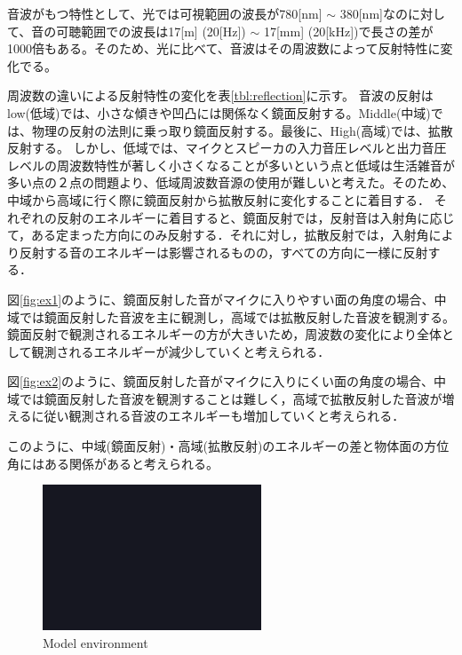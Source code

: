 音波がもつ特性として、光では可視範囲の波長が780[nm] $\sim$ 380[nm]なのに対して、音の可聴範囲での波長は17[m] (20[Hz]) $\sim$ 17[mm] (20[kHz])で長さの差が1000倍もある。そのため、光に比べて、音波はその周波数によって反射特性に変化でる。

周波数の違いによる反射特性の変化を表\ref{tbl:reflection}に示す。
音波の反射はlow(低域)では、小さな傾きや凹凸には関係なく鏡面反射する。Middle(中域)では、物理の反射の法則に乗っ取り鏡面反射する。最後に、High(高域)では、拡散反射する。
しかし、低域では、マイクとスピーカの入力音圧レベルと出力音圧レベルの周波数特性が著しく小さくなることが多いという点と低域は生活雑音が多い点の２点の問題より、低域周波数音源の使用が難しいと考えた。そのため、中域から高域に行く際に鏡面反射から拡散反射に変化することに着目する．
それぞれの反射のエネルギーに着目すると、鏡面反射では，反射音は入射角に応じて，ある定まった方向にのみ反射する．それに対し，拡散反射では，入射角により反射する音のエネルギーは影響されるものの，すべての方向に一様に反射する．

図\ref{fig:ex1}のように、鏡面反射した音がマイクに入りやすい面の角度の場合、中域では鏡面反射した音波を主に観測し，高域では拡散反射した音波を観測する。鏡面反射で観測されるエネルギーの方が大きいため，周波数の変化により全体として観測されるエネルギーが減少していくと考えられる．

図\ref{fig:ex2}のように、鏡面反射した音がマイクに入りにくい面の角度の場合、中域では鏡面反射した音波を観測することは難しく，高域で拡散反射した音波が増えるに従い観測される音波のエネルギーも増加していくと考えられる．

このように、中域(鏡面反射)・高域(拡散反射)のエネルギーの差と物体面の方位角にはある関係があると考えられる。

\begin{figure}[t]
  \begin{center}
  \vspace{1zh}
    \includegraphics[width=65mm]{images/fig_sample.png}   
  \end{center}
  \caption{Model environment}
  \label{fig:env}
\end{figure}

